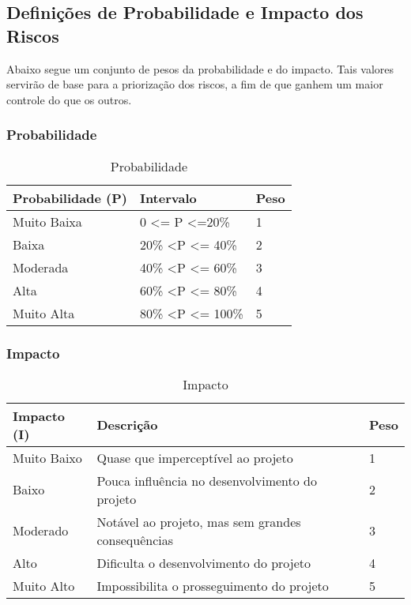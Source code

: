 \subsection{Definições de Probabilidade e Impacto dos Riscos}

Abaixo segue um conjunto de pesos da probabilidade e do impacto. Tais valores servirão de base para a priorização dos riscos, a fim de que ganhem um maior controle do que os outros.

\subsubsection{Probabilidade}

\begin{table}[h]
\centering
\caption{Probabilidade}
\label{probabilidade}
\begin{tabular}{|l|l|l|}
\hline
\textbf{Probabilidade (P)} & \textbf{Intervalo} & \textbf{Peso}\\  \hline
Muito Baixa       & 0 \textless= P \textless=20\%     & 1    \\
Baixa             & 20\% \textless P \textless= 40\%  & 2    \\
Moderada          & 40\% \textless P \textless= 60\%  & 3    \\ 
Alta              & 60\% \textless P \textless= 80\%  & 4    \\ 
Muito Alta        & 80\% \textless P \textless= 100\% & 5    \\ 
\hline
\end{tabular}
\end{table}

\subsubsection{Impacto}

\begin{table}[ht]
\centering
\caption{Impacto}
\label{impacto}
\begin{tabular}{|l|l|l|}
\hline
\textbf{Impacto (I)} & \textbf{Descrição}                                & \textbf{Peso} \\  \hline
Muito Baixo          & Quase que imperceptível ao projeto                & 1             \\
Baixo                & Pouca influência no desenvolvimento do projeto    & 2             \\
Moderado             & Notável ao projeto, mas sem grandes consequências & 3             \\
Alto                 & Dificulta o desenvolvimento do projeto            & 4             \\ 
Muito Alto           & Impossibilita o prosseguimento do projeto         & 5             \\ 
\hline
\end{tabular}
\end{table}

